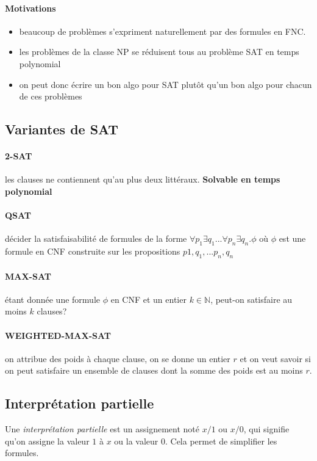 \documentclass[a4paper]{article}
\begin{document}
  \paragraph{Motivations}
  \begin{itemize}
    \item beaucoup de problèmes s'expriment naturellement par des formules en FNC.
    \item les problèmes de la classe NP se réduisent tous au problème SAT en temps polynomial
    \item on peut donc écrire un bon algo pour SAT plutôt qu'un bon algo pour chacun de ces problèmes
  \end{itemize}

  \subsection{Variantes de SAT}

    \paragraph{2-SAT} les clauses ne contiennent qu'au plus deux littéraux. \textbf{Solvable en temps polynomial}
    
    \paragraph{QSAT} 
    décider la satisfaisabilité de formules de la forme $\forall p_1 \exists q_1 ... \forall p_n \exists q_n.\phi$
    où $\phi$ est une formule en CNF construite sur les propositions $p1, q_1, ... p_n, q_n$

    \paragraph{MAX-SAT} étant donnée une formule $\phi$ en CNF et un entier $k \in \mathbb{N}$, 
    peut-on satisfaire au moins $k$ clauses?

    \paragraph{WEIGHTED-MAX-SAT} on attribue des poids à chaque clause, on se donne
    un entier $r$ et on veut savoir si on peut satisfaire un ensemble de clauses dont la 
    somme des poids est au moins $r$.

  \subsection{Interprétation partielle}
  Une \textit{interprétation partielle} est un assignement noté $x/1$ ou $x/0$, 
  qui signifie qu'on assigne la valeur $1$ à $x$ ou la valeur $0$. Cela permet
  de simplifier les formules. 
\end{document}
